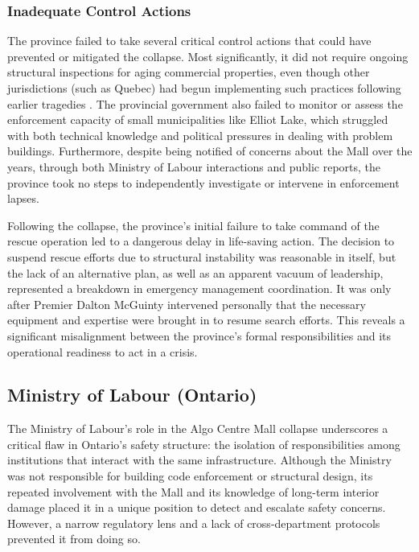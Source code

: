 \documentclass[12pt]{article}
\begin{document}
\subsubsection*{Inadequate Control Actions}
The province failed to take several critical control actions that could have prevented or mitigated the collapse. Most significantly, it did not require ongoing structural inspections for aging commercial properties, even though other jurisdictions (such as Quebec) had begun implementing such practices following earlier tragedies \cite[p.585-586]{AlgoLakeReport1}. The provincial government also failed to monitor or assess the enforcement capacity of small municipalities like Elliot Lake, which struggled with both technical knowledge and political pressures in dealing with problem buildings. Furthermore, despite being notified of concerns about the Mall over the years, through both Ministry of Labour interactions and public reports, the province took no steps to independently investigate or intervene in enforcement lapses.

Following the collapse, the province's initial failure to take command of the rescue operation led to a dangerous delay in life-saving action. The decision to suspend rescue efforts due to structural instability was reasonable in itself, but the lack of an alternative plan, as well as an apparent vacuum of leadership, represented a breakdown in emergency management coordination. It was only after Premier Dalton McGuinty intervened personally that the necessary equipment and expertise were brought in to resume search efforts. This reveals a significant misalignment between the province's formal responsibilities and its operational readiness to act in a crisis.

\subsection{Ministry of Labour (Ontario)}

The Ministry of Labour's role in the Algo Centre Mall collapse underscores a critical flaw in Ontario's safety structure: the isolation of responsibilities among institutions that interact with the same infrastructure. Although the Ministry was not responsible for building code enforcement or structural design, its repeated involvement with the Mall and its knowledge of long-term interior damage placed it in a unique position to detect and escalate safety concerns. However, a narrow regulatory lens and a lack of cross-department protocols prevented it from doing so.
\end{document}
